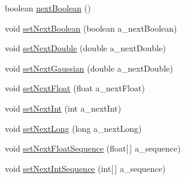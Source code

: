 \begin{DoxyCompactItemize}
boolean \hyperlink{classorg_1_1jgap_1_1impl_1_1_random_generator_for_testing_aa7d270ed55a004398e0a21f7a1188564}{next\-Boolean} ()
\item 
void \hyperlink{classorg_1_1jgap_1_1impl_1_1_random_generator_for_testing_ac48ce1e910e044c912783271b89eb417}{set\-Next\-Boolean} (boolean a\-\_\-next\-Boolean)
\item 
void \hyperlink{classorg_1_1jgap_1_1impl_1_1_random_generator_for_testing_a94b1fa47132f71c6baf921e7da78ed8d}{set\-Next\-Double} (double a\-\_\-next\-Double)
\item 
void \hyperlink{classorg_1_1jgap_1_1impl_1_1_random_generator_for_testing_abdac1c00c2a4becff8073bd3db302d79}{set\-Next\-Gaussian} (double a\-\_\-next\-Double)
\item 
void \hyperlink{classorg_1_1jgap_1_1impl_1_1_random_generator_for_testing_a8710f1cedd96ea560f7ef4c304ca9494}{set\-Next\-Float} (float a\-\_\-next\-Float)
\item 
void \hyperlink{classorg_1_1jgap_1_1impl_1_1_random_generator_for_testing_a1b932613b2fee932d0a2e953d7788051}{set\-Next\-Int} (int a\-\_\-next\-Int)
\item 
void \hyperlink{classorg_1_1jgap_1_1impl_1_1_random_generator_for_testing_ab36312757e818ad5a4aa0bbca8d079db}{set\-Next\-Long} (long a\-\_\-next\-Long)
\item 
void \hyperlink{classorg_1_1jgap_1_1impl_1_1_random_generator_for_testing_a5289e33e47327587981a7303491168df}{set\-Next\-Float\-Sequence} (float\mbox{[}$\,$\mbox{]} a\-\_\-sequence)
\item 
void \hyperlink{classorg_1_1jgap_1_1impl_1_1_random_generator_for_testing_a10db2cb04d6180ee36cab916dd50a6b6}{set\-Next\-Int\-Sequence} (int\mbox{[}$\,$\mbox{]} a\-\_\-sequence)
\end{DoxyCompactItemize}
